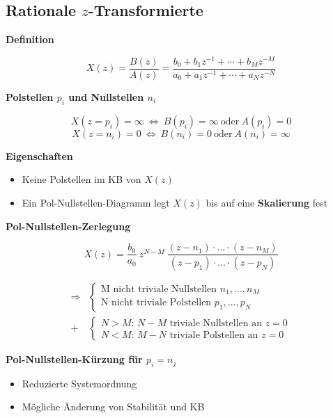 \documentclass[10pt,a4paper]{article}
\newcommand{\fancyformula}[2]{
	\small\raggedright{\sffamily\textbf{#1}}
	#2
}
\begin{document}
\subsection*{Rationale $z$-Transformierte}
\vspace{-1.5em}
\begin{multicols}{2}
	\fancyformula{Definition}{
		\[ X(z) = \dfrac{B(z)}{A(z)} = \dfrac{b_0 + b_1 z^{-1} + \cdots + b_M z^{-M}}{a_0 + a_1 z^{-1} + \cdots + a_N z^{-N}} \]
	}

	\fancyformula{Polstellen $p_i$ und Nullstellen $n_i$}{
		\[ X(z = p_i) = \infty ~ \Leftrightarrow ~ B(p_i) = \infty ~ \text{oder} ~ A(p_i) = 0 \]
		\[ X(z = n_i) = 0 ~ \Leftrightarrow ~ B(n_i) = 0 ~ \text{oder} ~ A(n_i) = \infty \]
	}

	\fancyformula{Eigenschaften}{
		\begin{itemize}
			\item Keine Polstellen im KB von $X(z)$
			\item Ein Pol-Nullstellen-Diagramm legt $X(z)$ bis auf eine \textbf{Skalierung} fest
		\end{itemize}
	}

	\fancyformula{Pol-Nullstellen-Zerlegung}{
		\[
			X(z) = \frac{b_{0}}{a_{0}} ~ z^{N-M} ~ \frac{(z-n_{1})\cdot \ldots \cdot(z-n_{M})}{(z-p_{1})\cdot \ldots \cdot(z-p_{N})}
		\]

		\begin{align*}
			\Rightarrow & \begin{cases}
				\text{M nicht triviale Nullstellen } n_{1},...,n_{M}\\
				\text{N nicht triviale Polstellen } p_{1},...,p_{N}
			\end{cases}\\
			+ & \begin{cases}
				N > M\text{: $N - M$ triviale Nullstellen an $z = 0$}\\
				N < M \text{: $M - N$ triviale Polstellen an $z = 0$}
			\end{cases}
		\end{align*}
	}

	{\small\raggedright\sffamily\textbf{Pol-Nullstellen-Kürzung für $p_i = n_j$}}

	\begin{itemize}
		\item Reduzierte Systemordnung
		\item Mögliche Änderung von Stabilität und KB
	\end{itemize}



\end{multicols}
\end{document}
